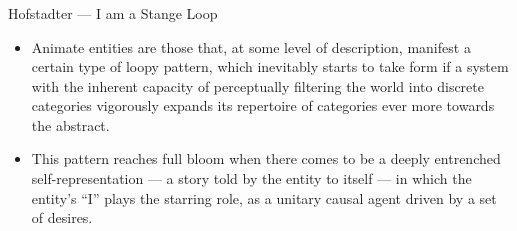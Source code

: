 \documentclass[UTF8,11pt,colorlinks,compress,openany]{beamer}%
\begin{document}
\begin{frame}\frametitle{}
\begin{block}{Hofstadter --- I am a Stange Loop}
\begin{itemize}
	\item Animate entities are those that, at some level of description, manifest a certain type of loopy pattern, which inevitably starts to take form if a system with the inherent capacity of perceptually filtering the world into discrete categories vigorously expands its repertoire of categories ever more towards the abstract.
	\item This pattern reaches full bloom when there comes to be a deeply entrenched self-representation --- a story told by the entity to itself --- in which the entity's ``I'' plays the starring role, as a unitary causal agent driven by a set of desires.
\end{itemize}
\end{block}
\begin{figure}[H]
\end{figure}
\end{frame}
\end{document}
